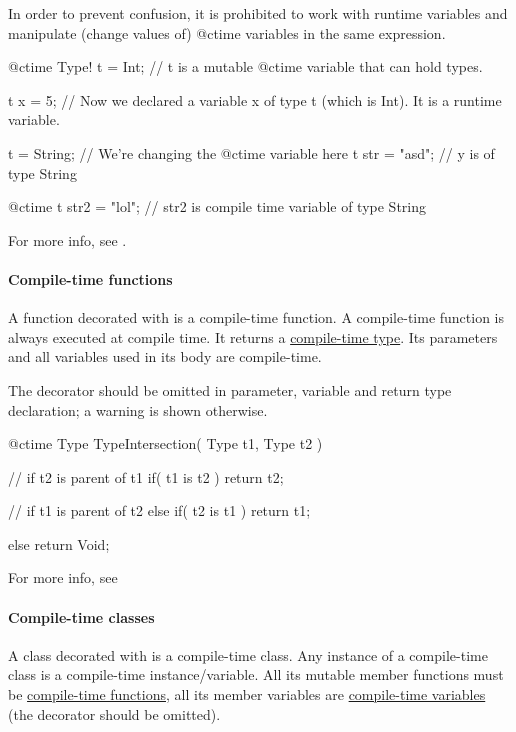In order to prevent confusion, it is prohibited to work with runtime variables and manipulate (change values of) @ctime variables in the same expression.

\begin{code}
@ctime Type! t = Int; // t is a mutable @ctime variable that can hold types.

t x = 5; // Now we declared a variable x of type t (which is Int). It is a runtime variable.

t = String; // We're changing the @ctime variable here
t str = "asd"; // y is of type String

@ctime t str2 = "lol"; // str2 is compile time variable of type String
\end{code}

For more info, see .

\paragraph{Compile-time functions}
A function decorated with  is a compile-time function. A compile-time function is always executed at compile time. It returns a \hyperref[ctime:class]{compile-time type}. Its parameters and all variables used in its body are compile-time.

The  decorator should be omitted in parameter, variable and return type declaration; a warning is shown otherwise.

\begin{code}
@ctime Type TypeIntersection( Type t1, Type t2 ) {
	// if t2 is parent of t1
	if( t1 is t2 )
		return t2;
		
	// if t1 is parent of t2
	else if( t2 is t1 )
		return t1;
	
	else
		return Void;
}
\end{code}

For more info, see 

\paragraph{Compile-time classes}
A class decorated with  is a compile-time class. Any instance of a compile-time class is a compile-time instance/variable. All its mutable member functions must be \hyperref[ctime:function]{compile-time functions}, all its member variables are \hyperref[ctime:variable]{compile-time variables} (the  decorator should be omitted).

